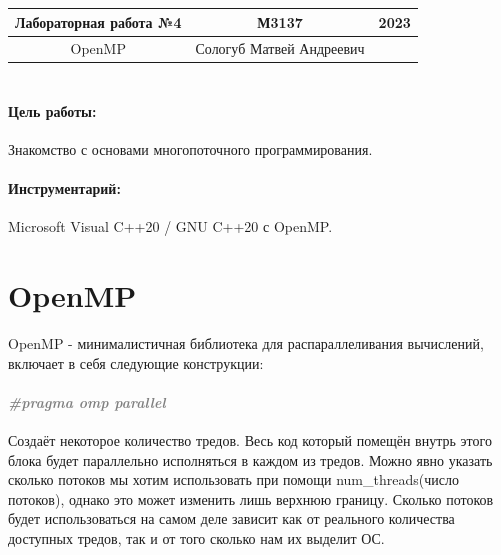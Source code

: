 \documentclass{article}
\begin{document}
	\pagestyle{empty}
	\normalsize
	\newcommand{\R}{{\mathbb R}}
	\newcommand{\N}{{\mathbb N}}
	\newcommand{\lm}[2]{\displaystyle \lim_{#2 \to \infty}{#1_{#2}}}
	\newcommand{\eps}{\varepsilon}
	\section{}
	\begin{center}
\begin{tabular}{ |c|c|c| } 
	\hline
	Лабораторная работа №4 & М3137 & 2023 \\ 
	\hline
	OpenMP & Сологуб Матвей Андреевич & \\ 
	\hline
\end{tabular}
\end{center}
	\large
	\section{}
\paragraph{Цель работы:}
Знакомство с основами многопоточного программирования.
\paragraph{Инструментарий:}
Microsoft Visual C++20 / GNU C++20 с OpenMP.
\section{OpenMP}
OpenMP - минималистичная библиотека для распараллеливания вычислений, включает в себя следующие конструкции:
\paragraph{\textcolor{gray}{\textit{\LARGE{\#pragma omp parallel}}}}
Создаёт некоторое количество тредов. Весь код который помещён внутрь этого блока будет параллельно исполняться в каждом из тредов. Можно явно указать сколько потоков мы хотим использовать при помощи num\_threads(число потоков), однако это может изменить лишь верхнюю границу. Сколько потоков будет использоваться на самом деле зависит как от реального количества доступных тредов, так и от того сколько нам их выделит ОС.
\end{document}
